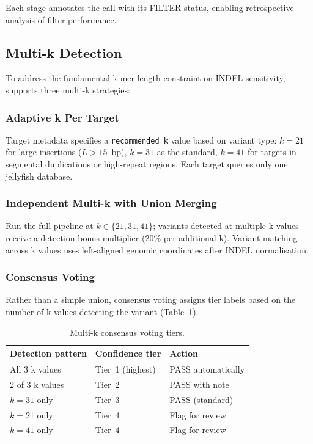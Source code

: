 Each stage annotates the call with its FILTER status, enabling retrospective
analysis of filter performance.

\subsection{Multi-k Detection}
\label{sec:multik}

To address the fundamental k-mer length constraint on INDEL sensitivity,
\kmerdet{} supports three multi-k strategies:

\subsubsection{Adaptive k Per Target}

Target metadata specifies a \texttt{recommended\_k} value based on variant type:
$k = 21$ for large insertions ($L > 15$~bp), $k = 31$ as the standard, $k = 41$
for targets in segmental duplications or high-repeat regions.  Each target
queries only one jellyfish database.

\subsubsection{Independent Multi-k with Union Merging}

Run the full pipeline at $k \in \{21, 31, 41\}$; variants detected at multiple
k values receive a detection-bonus multiplier (20\% per additional k).  Variant
matching across k values uses left-aligned genomic coordinates after INDEL
normalisation.

\subsubsection{Consensus Voting}

Rather than a simple union, consensus voting assigns tier labels based on the
number of k values detecting the variant (Table~\ref{tab:multikvoting}).

\begin{table}[h]
  \centering
  \caption{Multi-k consensus voting tiers.}
  \label{tab:multikvoting}
  \begin{tabular}{lll}
    \toprule
    Detection pattern & Confidence tier & Action \\
    \midrule
    All 3 k values & Tier~1 (highest) & PASS automatically \\
    2 of 3 k values & Tier~2 & PASS with note \\
    $k=31$ only & Tier~3 & PASS (standard) \\
    $k=21$ only & Tier~4 & Flag for review \\
    $k=41$ only & Tier~4 & Flag for review \\
    \bottomrule
  \end{tabular}
\end{table}

